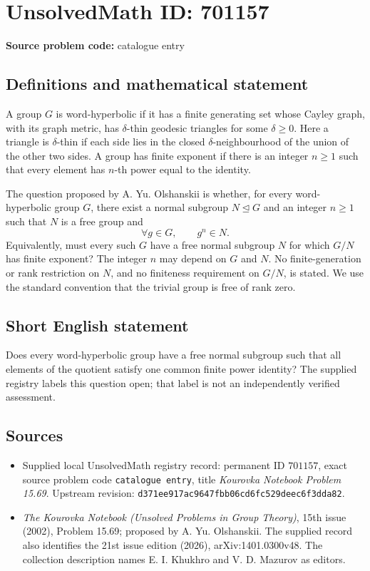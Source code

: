 \documentclass[11pt]{article}
\begin{document}
\section*{UnsolvedMath ID: 701157}
\textbf{Source problem code:} catalogue entry
\subsection{Definitions and mathematical statement}
A group \(G\) is word-hyperbolic if it has a finite generating set whose Cayley graph, with its graph metric, has \(\delta\)-thin geodesic triangles for some \(\delta\geq 0\). Here a triangle is \(\delta\)-thin if each side lies in the closed \(\delta\)-neighbourhood of the union of the other two sides. A group has finite exponent if there is an integer \(n\geq 1\) such that every element has \(n\)-th power equal to the identity.

The question proposed by A. Yu. Olshanskii is whether, for every word-hyperbolic group \(G\), there exist a normal subgroup \(N\trianglelefteq G\) and an integer \(n\geq 1\) such that \(N\) is a free group and
\[
\forall g\in G,\qquad g^n\in N.
\]
Equivalently, must every such \(G\) have a free normal subgroup \(N\) for which \(G/N\) has finite exponent? The integer \(n\) may depend on \(G\) and \(N\). No finite-generation or rank restriction on \(N\), and no finiteness requirement on \(G/N\), is stated. We use the standard convention that the trivial group is free of rank zero.
\subsection{Short English statement}
Does every word-hyperbolic group have a free normal subgroup such that all elements of the quotient satisfy one common finite power identity? The supplied registry labels this question open; that label is not an independently verified assessment.
\subsection{Sources}
\begin{itemize}
\item Supplied local UnsolvedMath registry record: permanent ID \(701157\), exact source problem code \texttt{catalogue entry}, title \emph{Kourovka Notebook Problem 15.69}. Upstream revision: \texttt{d371ee917ac9647fbb06cd6fc529deec6f3dda82}.
\item \emph{The Kourovka Notebook (Unsolved Problems in Group Theory)}, 15th issue (2002), Problem 15.69; proposed by A. Yu. Olshanskii. The supplied record also identifies the 21st issue edition (2026), arXiv:1401.0300v48. The collection description names E. I. Khukhro and V. D. Mazurov as editors.
\end{itemize}
\end{document}
